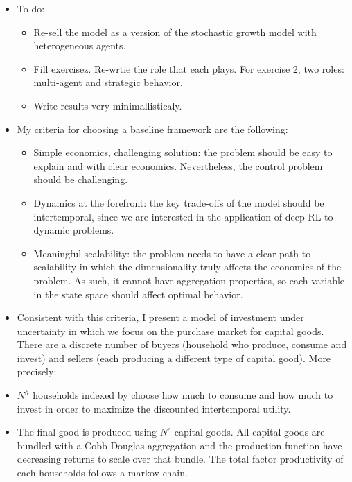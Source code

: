 \documentclass[11pt,english]{article}
\begin{document}
	\begin{itemize}
	
	\item {\color{red} To do: 
	
\begin{itemize}
	\item Re-sell the model as a version of the stochastic growth model with heterogeneous agents. 
	\item Fill exercisez. Re-wrtie the role that each plays. For exercise 2, two roles: multi-agent and strategic behavior.
	\item Write results very minimallisticaly. 
\end{itemize}}
	\item My criteria for choosing a baseline framework are the following:
	
	\begin{itemize}
		\item Simple economics, challenging solution: the problem should be easy to explain and with clear economics. Nevertheless, the control problem should be challenging. \medskip
		
		\item Dynamics at the forefront: the key trade-offs of the model should be intertemporal, since we are interested in the application of deep RL to dynamic problems. \medskip
		
		\item Meaningful scalability: the problem needs to have a clear path to scalability in which the dimensionality truly affects the economics of the problem. As such, it cannot have aggregation properties, so each variable in the state space should affect optimal behavior. \medskip
	\end{itemize}

	\item Consistent with this criteria, I present a model of investment under uncertainty in which we focus on the purchase market for capital goods. There are a discrete number of buyers (household who produce, consume and invest) and sellers (each producing a different type of capital good). More precisely:
	

	\item $N^h$ households indexed by  choose how much to consume and how much to invest in order to maximize the discounted intertemporal utility.\medskip
	
	\item The final good is produced using $N^c$ capital goods. All capital goods are bundled with a Cobb-Douglas aggregation and the production function have decreasing returns to scale over that bundle. The  total factor productivity of each households follows a markov chain.   \medskip
	

\end{itemize}
\end{document}
